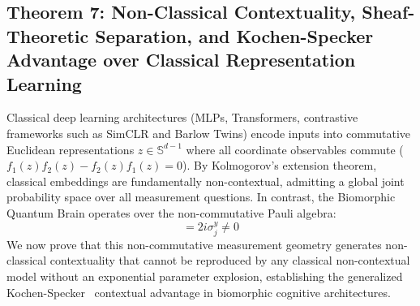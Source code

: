 \documentclass[10pt,twocolumn,3p]{article}
\begin{document}
\subsection{Theorem 7: Non-Classical Contextuality, Sheaf-Theoretic Separation, and Kochen-Specker Advantage over Classical Representation Learning}
\label{subsec:thm_contextuality_separation}

Classical deep learning architectures (MLPs, Transformers, contrastive frameworks such as SimCLR and Barlow Twins) encode inputs into commutative Euclidean representations $z \in \mathbb{S}^{d-1}$ where all coordinate observables commute ($f_1(z) f_2(z) - f_2(z) f_1(z) = 0$). By Kolmogorov's extension theorem, classical embeddings are fundamentally non-contextual, admitting a global joint probability space over all measurement questions. In contrast, the Biomorphic Quantum Brain operates over the non-commutative Pauli algebra:
\begin{equation}
    [\sigma_j^z, \sigma_j^x] = 2i \sigma_j^y \neq 0
\end{equation}
We now prove that this non-commutative measurement geometry generates non-classical contextuality that cannot be reproduced by any classical non-contextual model without an exponential parameter explosion, establishing the generalized Kochen-Specker~\cite{kochen1967} contextual advantage in biomorphic cognitive architectures.
\end{document}

